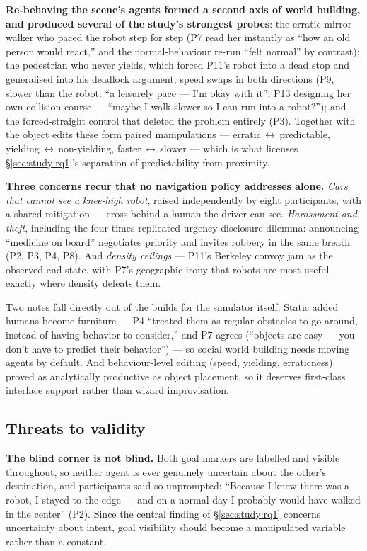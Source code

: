 \textbf{Re-behaving the scene's agents formed a second axis of world
building, and produced several of the study's strongest probes}: the
erratic mirror-walker who paced the robot step for step (P7 read her
instantly as ``how an old person would react,'' and the
normal-behaviour re-run ``felt normal'' by contrast); the pedestrian
who never yields, which forced P11's robot into a dead stop and
generalised into his deadlock argument; speed swaps in both directions
(P9, slower than the robot: ``a leisurely pace --- I'm okay with it'';
P13 designing her own collision course --- ``maybe I walk slower so I
can run into a robot?''); and the forced-straight control that deleted
the problem entirely (P3). Together with the object edits these form
paired manipulations --- erratic\,$\leftrightarrow$\,predictable,
yielding\,$\leftrightarrow$\,non-yielding,
faster\,$\leftrightarrow$\,slower --- which is what licenses
\S\ref{sec:study:rq1}'s separation of predictability from proximity.

\textbf{Three concerns recur that no navigation policy addresses
alone.} \emph{Cars that cannot see a knee-high robot}, raised
independently by eight participants, with a shared mitigation ---
cross behind a human the driver can see. \emph{Harassment and theft},
including the four-times-replicated urgency-disclosure dilemma:
announcing ``medicine on board'' negotiates priority and invites
robbery in the same breath (P2, P3, P4, P8). And \emph{density
ceilings} --- P11's Berkeley convoy jam as the observed end state,
with P7's geographic irony that robots are most useful exactly where
density defeats them.

Two notes fall directly out of the builds for the simulator itself.
Static added humans become furniture --- P4 ``treated them as regular
obstacles to go around, instead of having behavior to consider,'' and
P7 agrees (``objects are easy --- you don't have to predict their
behavior'') --- so social world building needs moving agents by
default. And behaviour-level editing (speed, yielding, erraticness)
proved as analytically productive as object placement, so it deserves
first-class interface support rather than wizard improvisation.

\subsection{Threats to validity}
\label{sec:study:limits}

\textbf{The blind corner is not blind.} Both goal markers are labelled
and visible throughout, so neither agent is ever genuinely uncertain
about the other's destination, and participants said so unprompted:
``Because I knew there was a robot, I stayed to the edge --- and on a
normal day I probably would have walked in the center'' (P2). Since the
central finding of \S\ref{sec:study:rq1} concerns uncertainty about
intent, goal visibility should become a manipulated variable rather
than a constant.

